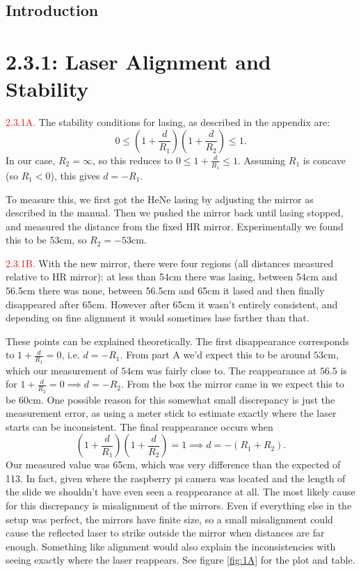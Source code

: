 \documentclass[letterpaper, reqno,11pt]{article}
\begin{document}
\subsection{Introduction}

\newpage

\section{2.3.1: Laser Alignment and Stability}

\noindent \textcolor{red}{2.3.1A.} The stability conditions for lasing, as described in the appendix are:
\[
0\leq \left(1+ \frac{d}{R_1}\right) \left( 1+ \frac{d}{R_2} \right) \leq 1
.\]
In our case, $R_2=\infty$, so this reduces to $0\leq 1+ \frac{d}{R_1}\leq 1$. Assuming $R_1$ is concave (so $R_1< 0$), this gives $d=-R_1$.

To measure this, we first got the HeNe lasing by adjusting the mirror as described in the manual. Then we pushed the mirror back until lasing stopped, and measured the distance from the fixed HR mirror. Experimentally we found this to be $53$cm, so $R_2=-53$cm.

\medskip

\noindent \textcolor{red}{2.3.1B.} With the new mirror, there were four regions (all distances measured relative to HR mirror): at less than 54cm there was lasing, between 54cm and 56.5cm there was none, between 56.5cm and 65cm it lased and then finally disappeared after 65cm. However after 65cm it wasn't entirely consistent, and depending on fine alignment it would sometimes lase farther than that.

These points can be explained theoretically. The first disappearance corresponds to $1+\frac{d}{R_1}=0$, i.e. $d=-R_1$. From part A we'd expect this to be around $53$cm, which our measurement of $54$cm was fairly close to. The reappearance at $56.5$ is for $1+\frac{d}{R_2}=0\implies d=-R_2$. From the box the mirror came in we expect this to be $60$cm. One possible reason for this somewhat small discrepancy is just the measurement error, as using a meter stick to estimate exactly where the laser starts can be inconsistent. The final reappearance occurs when
\[
\left(1+ \frac{d}{R_1}\right) \left( 1+ \frac{d}{R_2} \right) = 1\implies d=-(R_1+R_2)
.\]
Our measured value was 65cm, which was very difference than the expected of 113. In fact, given where the raspberry pi camera was located and the length of the slide we shouldn't have even seen a reappearance at all. The most likely cause for this discrepancy is misalignment of the mirrors. Even if everything else in the setup was perfect, the mirrors have finite size, so a small misalignment could cause the reflected laser to strike outside the mirror when distances are far enough. Something like alignment would also explain the inconsistencies with seeing exactly where the laser reappears. See figure \ref{fig:1A} for the plot and table.
\end{document}
